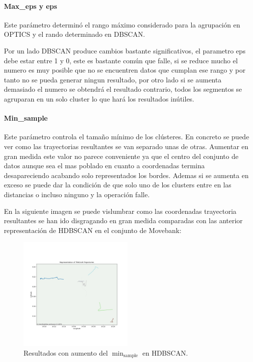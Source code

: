 \paragraph{Max\_eps y eps}

Este parámetro determinó el rango máximo considerado para la agrupación en OPTICS y el rando determinado en DBSCAN. 

Por un lado DBSCAN produce cambios bastante significativos, el parametro eps debe estar entre 1 y 0, este es bastante común que falle, si se reduce mucho el numero es muy posible que no se encuentren datos que cumplan ese rango y por tanto no se pueda generar ningun resultado, por otro lado si se aumenta demasiado el numero se obtendrá el resultado contrario, todos los segmentos se agruparan en un solo cluster lo que hará los resultados inútiles.

\paragraph{Min\_sample}

Este parámetro controla el tamaño mínimo de los clústeres. En concreto se puede ver como las trayectorias resultantes se van separado unas de otras. Aumentar en gran medida este valor no parece conveniente ya que el centro del conjunto de datos aunque sea el mas poblado en cuanto a coordenadas termina desapareciendo acabando solo representados los bordes. Ademas si se aumenta en exceso se puede dar la condición de que solo uno de los clusters entre en las distancias o incluso ninguno y la operación falle.

En la siguiente imagen se puede vislumbrar como las coordenadas trayectoria resultantes se han ido disgragando en gran medida comparadas con las anterior representación de HDBSCAN en el conjunto de Movebank:

\begin{figure}[h!]
    \centering
    \includegraphics[width=0.5\textwidth]{img/Movebank/map_hdbscan_min.png}
    \caption{Resultados con aumento del $\min_{\text{sample}}$ en HDBSCAN.}
    \label{fig:min_sample}
\end{figure}

